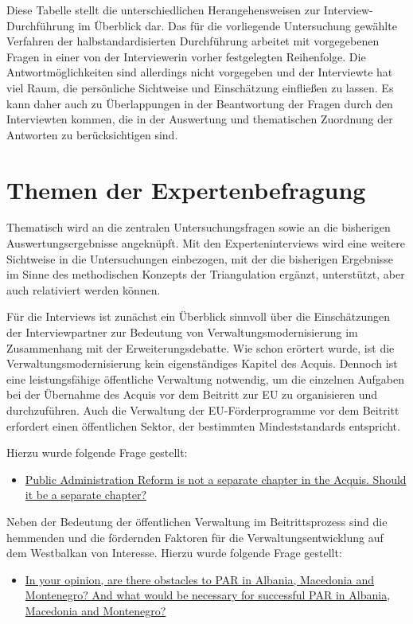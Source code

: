 Diese Tabelle stellt die unterschiedlichen Herangehensweisen zur Interview-Durchführung im Überblick dar. Das für die vorliegende Untersuchung gewählte Verfahren der halbstandardisierten Durchführung arbeitet mit vorgegebenen Fragen in einer von der Interviewerin vorher festgelegten Reihenfolge. Die Antwortmöglichkeiten sind allerdings nicht vorgegeben und der Interviewte hat viel Raum, die persönliche Sichtweise und Einschätzung einfließen zu lassen. Es kann daher auch zu Überlappungen in der Beantwortung der Fragen durch den Interviewten kommen, die in der Auswertung und thematischen Zuordnung der Antworten zu berücksichtigen sind.
\section{Themen der Expertenbefragung} 
Thematisch wird an die zentralen Untersuchungsfragen sowie an die bisherigen Auswertungsergebnisse angeknüpft. Mit den Experteninterviews wird eine weitere Sichtweise in die Untersuchungen einbezogen, mit der die bisherigen Ergebnisse im Sinne des methodischen Konzepts der Triangulation ergänzt, unterstützt, aber auch relativiert werden können.\par
Für die Interviews ist zunächst ein Überblick sinnvoll über die Einschätzungen der Interviewpartner zur Bedeutung von Verwaltungsmodernisierung im Zusammenhang mit der Erweiterungsdebatte. Wie schon erörtert wurde, ist die Verwaltungsmodernisierung kein eigenständiges Kapitel des Acquis. Dennoch ist eine leistungsfähige öffentliche Verwaltung notwendig, um die einzelnen Aufgaben bei der Übernahme des Acquis vor dem Beitritt zur EU zu organisieren und durchzuführen. Auch die Verwaltung der EU-Förderprogramme vor dem Beitritt erfordert einen öffentlichen Sektor, der bestimmten Mindeststandards entspricht.\par
Hierzu wurde folgende Frage gestellt:\par
\begin{itemize}[label={}]
\item \ul{Public Administration Reform is not a separate chapter in the Acquis. Should it be a separate chapter?}
\end{itemize}
Neben der Bedeutung der öffentlichen Verwaltung im Beitrittsprozess sind die hemmenden und die fördernden Faktoren für die Verwaltungsentwicklung auf dem Westbalkan von Interesse. Hierzu wurde folgende Frage gestellt:
\begin{itemize}[label={}]
\item \ul{In your opinion, are there obstacles to PAR in Albania, Macedonia and Montenegro? And what would be necessary for successful PAR in Albania, Macedonia and Montenegro?}
\end{itemize}

